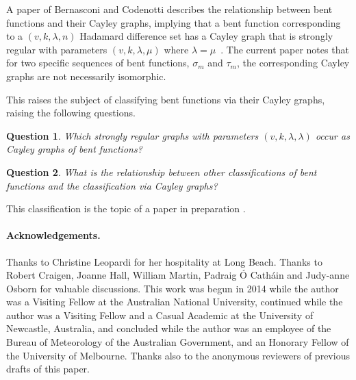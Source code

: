 \documentclass[12pt,a4paper]{article}
\newtheorem{Question}{Question}
\begin{document}
A paper of Bernasconi and Codenotti describes the relationship between bent functions and
their Cayley graphs, implying that a bent function corresponding to a $(v,k,\lambda,n)$ Hada\-mard difference set has a Cayley graph
that is strongly regular with parameters $(v,k,\lambda,\mu)$ where $\lambda=\mu$~\cite[Lemma 12]{BerC99}.
The current paper notes that for two specific sequences of bent functions, $\sigma_m$ and $\tau_m$,
the corresponding Cayley graphs are not necessarily isomorphic.

This raises the subject of classifying bent functions via their Cayley graphs, raising the following questions.
\begin{Question}
Which strongly regular graphs with parameters $(v,k,\lambda,\lambda)$ occur as Cayley graphs of bent functions?
\end{Question}
\begin{Question}
What is the relationship between other classifications of bent functions and the classification via Cayley graphs?
\end{Question}
This classification is the topic of a paper in preparation \cite{Leo16Classifying}.

\paragraph*{Acknowledgements.}

Thanks to Christine Leopardi for her hospitality at Long Beach.
Thanks to Robert Craigen, Joanne Hall, William Martin,
Padraig {\'O} Cath{\'a}in and Judy-anne Osborn for valuable discussions.
This work was begun in 2014 while the author was a Visiting Fellow at the Australian National University,
continued while the author was a Visiting Fellow and a Casual Academic at the University of Newcastle, Australia,
and concluded while the author was an employee of the Bureau of Meteorology of the Australian
Government, and an Honorary Fellow of the University of Melbourne.
Thanks also to the anonymous reviewers of previous drafts of this paper.








%
\end{document}
